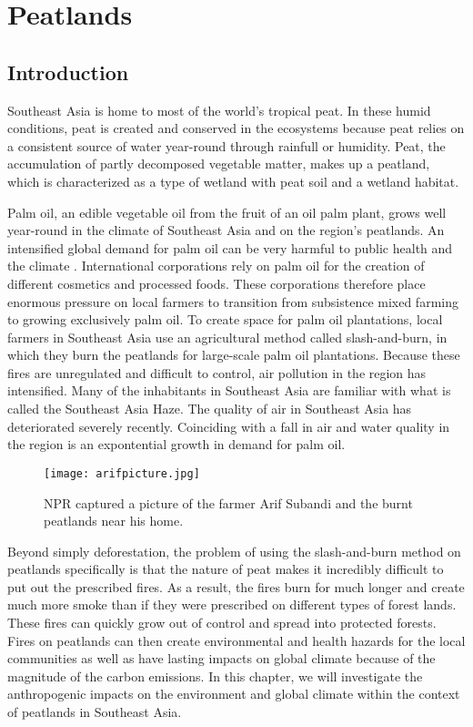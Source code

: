 \chapter{Peatlands}\label{ch:peatlands}

\section{Introduction}

Southeast Asia is home to most of the world's tropical peat. In these humid conditions, peat is created and conserved in the ecosystems because peat relies on a consistent source of water year-round through rainfull or humidity. Peat, the accumulation of partly decomposed vegetable matter, makes up a peatland, which is characterized as a type of wetland with peat soil and a wetland habitat. 

Palm oil, an edible vegetable oil from the fruit of an oil palm plant, grows well year-round in the climate of Southeast Asia and on the region's peatlands. An intensified global demand for palm oil can be very harmful to public health and the climate \citep{knitr2013}. International corporations rely on palm oil for the creation of different cosmetics and processed foods. These corporations therefore place enormous pressure on local farmers to transition from subsistence mixed farming to growing exclusively palm oil. To create space for palm oil plantations, local farmers in Southeast Asia use an agricultural method called slash-and-burn, in which they burn the peatlands for large-scale palm oil plantations. Because these fires are unregulated and difficult to control, air pollution in the region has intensified. Many of the inhabitants in Southeast Asia are familiar with what is called the Southeast Asia Haze. The quality of air in Southeast Asia has deteriorated severely recently. Coinciding with a fall in air and water quality in the region is an expontential growth in demand for palm oil. 

\begin{figure}
  \texttt{[image: arifpicture.jpg]}
  \caption{NPR captured a picture of the farmer Arif Subandi and the burnt peatlands near his home.}
  \label{fig:arifpicture}
\end{figure}

Beyond simply deforestation, the problem of using the slash-and-burn method on peatlands specifically is that the nature of peat makes it incredibly difficult to put out the prescribed fires. As a result, the fires burn for much longer and create much more smoke than if they were prescribed on different types of forest lands. These fires can quickly grow out of control and spread into protected forests. Fires on peatlands can then create environmental and health hazards for the local communities as well as have lasting impacts on global climate because of the magnitude of the carbon emissions. In this chapter, we will investigate the anthropogenic impacts on the environment and global climate within the context of peatlands in Southeast Asia. 

